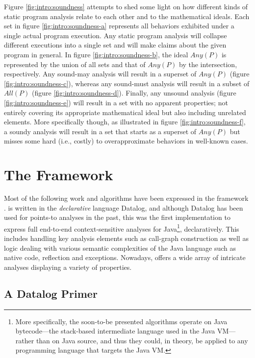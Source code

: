 Figure \ref{fig:intro:soundness} attempts to shed some light on how different kinds of static program analysis relate to each other and to the mathematical ideals. Each set in figure \ref{fig:intro:soundness-a} represents all behaviors exhibited under a single actual program execution. Any static program analysis will collapse different executions into a single set and will make claims about the given program in general. In figure \ref{fig:intro:soundness-b}, the ideal $Any(P)$ is represented by the union of all sets and that of $Any(P)$ by the intersection, respectively. Any sound-may analysis will result in a superset of $Any(P)$ (figure \ref{fig:intro:soundness-c}), whereas any sound-must analysis will result in a subset of $All(P)$ (figure \ref{fig:intro:soundness-d}). Finally, any unsound analysis (figure \ref{fig:intro:soundness-e}) will result in a set with no apparent properties; not entirely covering its appropriate mathematical ideal but also including unrelated elements. More specifically though, as illustrated in figure \ref{fig:intro:soundness-f}, a soundy analysis will result in a set that starts as a superset of $Any(P)$ but misses some hard (i.e., costly) to overapproximate behaviors in well-known cases.


\section{The \doop{} Framework}

Most of the following work and algorithms have been expressed in the \doop{} framework \cite{oopsla:2009:Bravenboer}. \doop{} is written in the \emph{declarative} language Datalog, and although Datalog has been used for points-to analyses in the past, this was the first implementation to express full end-to-end context-sensitive analyses for Java\footnote{More specifically, the soon-to-be presented algorithms operate on Java bytecode---the stack-based intermediate language used in the Java VM---rather than on Java source, and thus they could, in theory, be applied to any programming language that targets the Java VM.}, declaratively. This includes handling key analysis elements such as call-graph construction as well as logic dealing with various semantic complexities of the Java language such as native code, reflection and exceptions. Nowadays, \doop{} offers a wide array of intricate analyses displaying a variety of properties.

\subsection*{A Datalog Primer}

